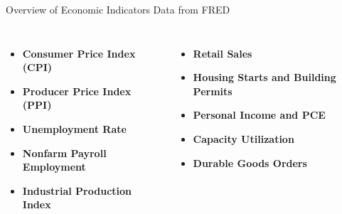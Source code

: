 \documentclass{beamer}
\begin{document}
\begin{frame}{Overview of Economic Indicators Data from FRED}
    \begin{columns}
        \begin{itemize}
            \item \textbf{Consumer Price Index (CPI)}
            \item \textbf{Producer Price Index (PPI)}
            \item \textbf{Unemployment Rate}
            \item \textbf{Nonfarm Payroll Employment}
            \item \textbf{Industrial Production Index}
        \end{itemize}
        \begin{itemize}
            \item \textbf{Retail Sales}
            \item \textbf{Housing Starts and Building Permits}
            \item \textbf{Personal Income and PCE}
            \item \textbf{Capacity Utilization}
            \item \textbf{Durable Goods Orders}
        \end{itemize}
    \end{columns}
\end{frame}
\end{document}
